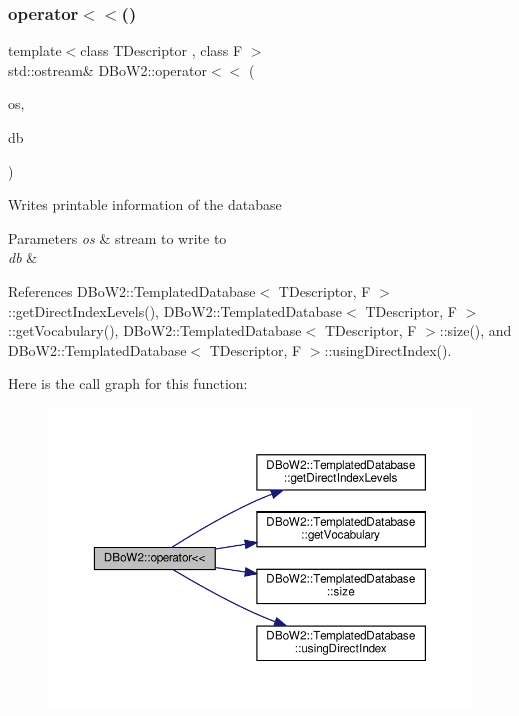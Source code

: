\subsubsection{\texorpdfstring{operator$<$$<$()}{operator<<()}\hspace{0.1cm}{\footnotesize\ttfamily [3/4]}}
{\footnotesize\ttfamily template$<$class T\+Descriptor , class F $>$ \\
std\+::ostream\& D\+Bo\+W2\+::operator$<$$<$ (\begin{DoxyParamCaption}\item[{std\+::ostream \&}]{os,  }\item[{const \hyperlink{classDBoW2_1_1TemplatedDatabase}{Templated\+Database}$<$ T\+Descriptor, F $>$ \&}]{db }\end{DoxyParamCaption})}

Writes printable information of the database 
\begin{DoxyParams}{Parameters}
{\em os} & stream to write to \\
\hline
{\em db} & \\
\hline
\end{DoxyParams}


References D\+Bo\+W2\+::\+Templated\+Database$<$ T\+Descriptor, F $>$\+::get\+Direct\+Index\+Levels(), D\+Bo\+W2\+::\+Templated\+Database$<$ T\+Descriptor, F $>$\+::get\+Vocabulary(), D\+Bo\+W2\+::\+Templated\+Database$<$ T\+Descriptor, F $>$\+::size(), and D\+Bo\+W2\+::\+Templated\+Database$<$ T\+Descriptor, F $>$\+::using\+Direct\+Index().

Here is the call graph for this function\+:\nopagebreak
\begin{figure}[H]
\begin{center}
\leavevmode
\includegraphics[width=350pt]{namespaceDBoW2_ac1f00f5484f61d6ab3b1f650955210d8_cgraph}
\end{center}
\end{figure}
\mbox{\label{namespaceDBoW2_aecdf616fe16d2cf09f521a603b9d43f1}} 
